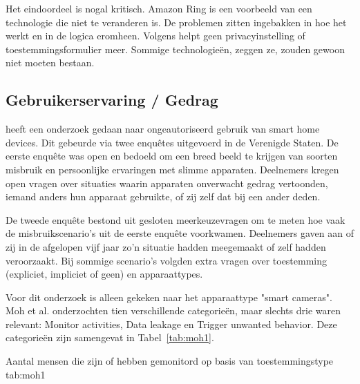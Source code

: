 \documentclass[nonacm, sigconf]{acmart}
\begin{document}
    \noindent Het eindoordeel is nogal kritisch.
    Amazon Ring is een voorbeeld van een technologie die niet te veranderen is.
    De problemen zitten ingebakken in hoe het werkt en in de logica eromheen.
    Volgens \parencite{selinger2022amazon} helpt geen privacyinstelling of toestemmingsformulier meer.
    Sommige technologieën, zeggen ze, zouden gewoon niet moeten bestaan.

    \subsection{Gebruikerservaring / Gedrag}\label{subsec:gebruikerservaring-/-gedrag2}


    \parencite{moh2023characterizing} heeft een onderzoek gedaan naar ongeautoriseerd gebruik van smart home devices.
    Dit gebeurde via twee enquêtes uitgevoerd in de Verenigde Staten.
    De eerste enquête was open en bedoeld om een breed beeld te krijgen van soorten misbruik en persoonlijke ervaringen met slimme apparaten.
    Deelnemers kregen open vragen over situaties waarin apparaten onverwacht gedrag vertoonden, iemand anders hun apparaat gebruikte, of zij zelf dat bij een ander deden.

    De tweede enquête bestond uit gesloten meerkeuzevragen om te meten hoe vaak de misbruikscenario's uit de eerste enquête voorkwamen.
    Deelnemers gaven aan of zij in de afgelopen vijf jaar zo'n situatie hadden meegemaakt of zelf hadden veroorzaakt.
    Bij sommige scenario's volgden extra vragen over toestemming (expliciet, impliciet of geen) en apparaattypes.

    Voor dit onderzoek is alleen gekeken naar het apparaattype "smart cameras".
    Moh et al. onderzochten tien verschillende categorieën, maar slechts drie waren relevant: Monitor activities, Data leakage en Trigger unwanted behavior.
    Deze categorieën zijn samengevat in Tabel~\ref{tab:moh1}.

    \begin{SimpleTable}[s{0.3}s{0.3}s{0.3}s{0.3}]{Aantal mensen die zijn of hebben gemonitord op basis van toestemmingstype \parencite{moh2023characterizing}}{tab:moh1}
        \TableEmpty{}
    \end{SimpleTable}
\end{document}
